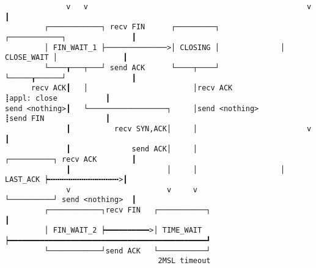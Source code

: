 \documentclass[varwidth=70em,crop]{standalone}
\begin{document}
\begin{verbatim}
              v   v                                                  v                      ┃
         ┌────────────┐ recv FIN      ┌─────────┐              ┌────────────┐               ┃
         │ FIN_WAIT_1 ├──────────────>│ CLOSING │              │ CLOSE_WAIT │               ┃
         └────┰───┬───┘ send ACK      └────┬────┘              └─────┰──────┘               ┃
      recv ACK┃   │                        │recv ACK                 ┋appl: close           ┃
send <nothing>┃   └──────────────────┐     │send <nothing>           ┋send FIN              ┃
              ┃          recv SYN,ACK│     │                         v                      ┃
              ┃              send ACK│     │                   ┌──────────┐ recv ACK        ┃
              ┃                      │     │                   │ LAST_ACK ┝╍╍╍╍╍╍╍╍╍╍╍╍╍╍╍╍>┃
              v                      v     v                   └──────────┘ send <nothing>  ┃
         ┌────────────┐recv FIN   ┌───────────┐                                             ┃
         │ FIN_WAIT_2 ┝━━━━━━━━━━>│ TIME_WAIT ┝━━━━━━━━━━━━━━━━━━━━━━━━━━━━━━━━━━━━━━━━━━━━━┛
         └────────────┘send ACK   └───────────┘
                                   2MSL timeout
\end{verbatim}
\end{document}

